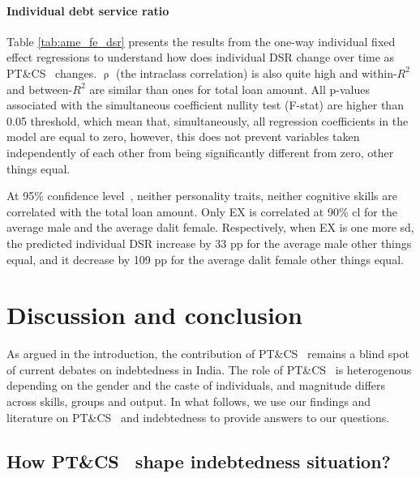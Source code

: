 \documentclass[a4paper, 11pt, onecolumn]{article}
\newcommand{\ote}{other things equal}
\newcommand{\cl}{confidence level}
\newcommand{\PTCS}{PT\&CS}
\begin{document}


\paragraph{Individual debt service ratio}
Table \ref{tab:ame_fe_dsr} presents the results from the one-way individual fixed effect regressions to understand how does individual DSR change over time as \PTCS~ changes.
$\uprho$ (the intraclass correlation) is also quite high and within-$R^2$ and between-$R^2$ are similar than ones for total loan amount.
All p-values associated with the simultaneous coefficient nullity test (F-stat) are higher than 0.05 threshold, which mean that, simultaneously, all regression coefficients in the model are equal to zero, however, this does not prevent variables taken independently of each other from being significantly different from zero, \ote.

At 95\% \cl~, neither personality traits, neither cognitive skills are correlated with the total loan amount.
Only EX is correlated at 90\% cl for the average male and the average dalit female.
Respectively, when EX is one more sd, the predicted individual DSR increase by 33 pp for the average male \ote, and it decrease by 109 pp for the average dalit female \ote.




\section{Discussion and conclusion}

As argued in the introduction, the contribution of \PTCS~ remains a blind spot of current debates on indebtedness in India.
The role of \PTCS~ is heterogenous depending on the gender and the caste of individuals, and magnitude differs across skills, groups and output.
In what follows, we use our findings and literature on \PTCS~ and indebtedness to provide answers to our questions.

	\subsection{How \PTCS~ shape indebtedness situation?}
\end{document}
